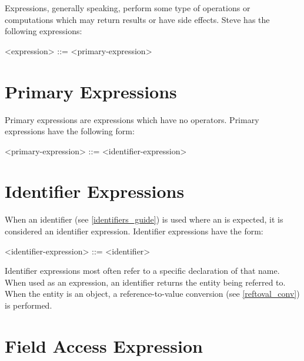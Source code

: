Expressions, generally speaking, perform some type of operations or computations which may return results or have side effects. Steve has the following expressions:

\begin{minip}
\begin{grammar}
<expression> ::=
<primary-expression>
\end{grammar}
\end{minip}

\section{Primary Expressions} \label{primary_expr_guide}

Primary expressions are expressions which have no operators. Primary expressions have the following form:

\begin{minip}
\begin{grammar}
<primary-expression> ::= 
<identifier-expression>
\end{grammar}
\end{minip}

\section{Identifier Expressions} \label{id_expr_guide}

When an identifier (see \ref{identifiers_guide}) is used where an  is expected, it is considered an identifier expression. Identifier expressions have the form:

\begin{minip}
\begin{grammar}
<identifier-expression> ::= <identifier>
\end{grammar}
\end{minip}

Identifier expressions most often refer to a specific declaration of that name. When used as an expression, an identifier returns the entity being referred to. When the entity is an object, a reference-to-value conversion (see \ref{reftoval_conv}) is performed.

\section{Field Access Expression} \label{field_access_expr_guide}

